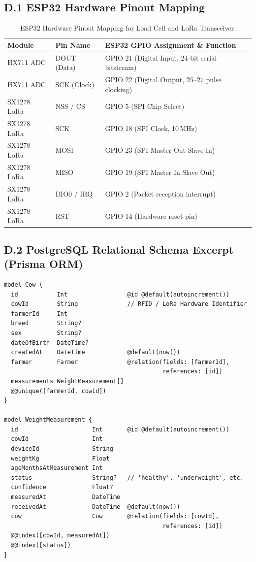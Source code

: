 \documentclass[11pt,a4paper]{report}
\begin{document}
\subsection*{D.1 ESP32 Hardware Pinout Mapping}
\begin{table}[htbp]
    \centering
    \caption{ESP32 Hardware Pinout Mapping for Load Cell and LoRa Transceiver.}
    \label{tab:app_pinout}
    \vspace{0.2cm}
    \small
    \begin{tabularx}{\textwidth}{|l|l|X|}
        \hline
        \rowcolor{tableShade}
        Module & Pin Name & ESP32 GPIO Assignment \& Function \\ \hline
        HX711 ADC & DOUT (Data) & GPIO 21 (Digital Input, 24-bit serial bitstream) \\ \hline
        HX711 ADC & SCK (Clock) & GPIO 22 (Digital Output, 25--27 pulse clocking) \\ \hline
        SX1278 LoRa & NSS / CS & GPIO 5 (SPI Chip Select) \\ \hline
        SX1278 LoRa & SCK & GPIO 18 (SPI Clock, 10\,MHz) \\ \hline
        SX1278 LoRa & MOSI & GPIO 23 (SPI Master Out Slave In) \\ \hline
        SX1278 LoRa & MISO & GPIO 19 (SPI Master In Slave Out) \\ \hline
        SX1278 LoRa & DIO0 / IRQ & GPIO 2 (Packet reception interrupt) \\ \hline
        SX1278 LoRa & RST & GPIO 14 (Hardware reset pin) \\ \hline
    \end{tabularx}
\end{table}

\subsection*{D.2 PostgreSQL Relational Schema Excerpt (Prisma ORM)}
\begin{verbatim}
model Cow {
  id           Int                 @id @default(autoincrement())
  cowId        String              // RFID / LoRa Hardware Identifier
  farmerId     Int
  breed        String?
  sex          String?
  dateOfBirth  DateTime?
  createdAt    DateTime            @default(now())
  farmer       Farmer              @relation(fields: [farmerId], 
                                             references: [id])
  measurements WeightMeasurement[]
  @@unique([farmerId, cowId])
}

model WeightMeasurement {
  id                     Int       @id @default(autoincrement())
  cowId                  Int
  deviceId               String
  weightKg               Float
  ageMonthsAtMeasurement Int
  status                 String?   // 'healthy', 'underweight', etc.
  confidence             Float?
  measuredAt             DateTime
  receivedAt             DateTime  @default(now())
  cow                    Cow       @relation(fields: [cowId], 
                                             references: [id])
  @@index([cowId, measuredAt])
  @@index([status])
}
\end{verbatim}
\end{document}
